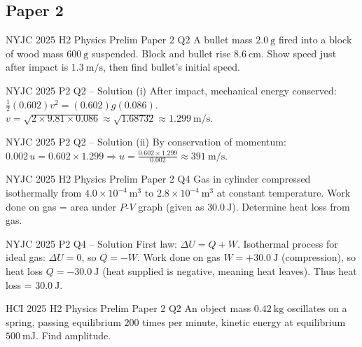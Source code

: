 \documentclass[11pt]{beamer}
\begin{document}
\subsection{Paper 2}

\begin{frame}[shrink=15]{NYJC 2025 H2 Physics Prelim Paper 2 Q2}
A bullet mass $2.0\ \mathrm{g}$ fired into a block of wood mass $600\ \mathrm{g}$ suspended. Block and bullet rise $8.6\ \mathrm{cm}$. Show speed just after impact is $1.3\ \mathrm{m/s}$, then find bullet's initial speed.
\end{frame}

\begin{frame}{NYJC 2025 P2 Q2 – Solution (i)}
After impact, mechanical energy conserved: $\frac12 (0.602) v^2 = (0.602) g (0.086)$.
$v = \sqrt{2\times9.81\times0.086} \approx \sqrt{1.68732} \approx 1.299\ \mathrm{m/s}$.
\end{frame}

\begin{frame}{NYJC 2025 P2 Q2 – Solution (ii)}
By conservation of momentum:
$0.002\, u = 0.602\times1.299 \Rightarrow u = \frac{0.602\times1.299}{0.002} \approx 391\ \mathrm{m/s}$.
\end{frame}

\begin{frame}[shrink=15]{NYJC 2025 H2 Physics Prelim Paper 2 Q4}
Gas in cylinder compressed isothermally from $4.0\times10^{-4}\ \mathrm{m^3}$ to $2.8\times10^{-4}\ \mathrm{m^3}$ at constant temperature. Work done on gas = area under $P$-$V$ graph (given as $30.0\ \mathrm{J}$). Determine heat loss from gas.
\end{frame}

\begin{frame}{NYJC 2025 P2 Q4 – Solution}
First law: $\Delta U = Q + W$.
Isothermal process for ideal gas: $\Delta U = 0$, so $Q = -W$.
Work done on gas $W = +30.0\ \mathrm{J}$ (compression), so heat loss $Q = -30.0\ \mathrm{J}$ (heat supplied is negative, meaning heat leaves).
Thus heat loss = $30.0\ \mathrm{J}$.
\end{frame}

\begin{frame}[shrink=15]{HCI 2025 H2 Physics Prelim Paper 2 Q2}
An object mass $0.42\ \mathrm{kg}$ oscillates on a spring, passing equilibrium $200$ times per minute, kinetic energy at equilibrium $500\ \mathrm{mJ}$. Find amplitude.
\end{frame}
\end{document}
